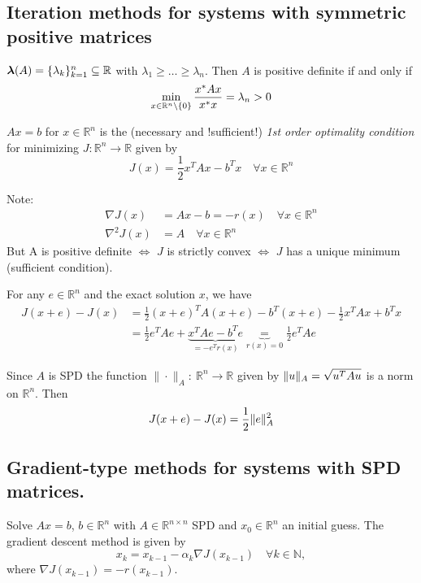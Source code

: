 \documentclass[12pt]{article}
\theoremstyle{definition}
\theoremstyle{remark}
\numberwithin{equation}{section}
\newcommand{\R}{\mathbb{R}}
\newcommand{\N}{\mathbb{N}}
\newcommand{\normempty}{\|\cdot\|}
\newcommand{\spectrum}[1]{\bm{\lambda}(#1)}
\DeclarePairedDelimiter{\norm}{\lVert}{\rVert}
\DeclarePairedDelimiter{\set}{\{}{\}}
\begin{document}
\subsection{Iteration methods for systems with symmetric positive matrices}
$\spectrum{A} = \set{\lambda_k}_{k=1}^n \subseteq \R$ with $\lambda_1 \geq \ldots \geq \lambda_n$. Then $A$ is positive definite if and only if
\begin{equation*}
  \min_{x \in \R^n \setminus \set{0}} \frac{x^*Ax}{x^*x} = \lambda_n > 0
\end{equation*}

$Ax = b$ for $x \in \R^n$ is the (necessary and !sufficient!) \emph{1st order optimality condition} for minimizing $J: \R^n \rightarrow \R$ given by
\begin{equation*}
  J(x) = \frac{1}{2}x^TAx - b^Tx \quad \forall x \in \R^n
\end{equation*}

Note:
\begin{align*}
  \nabla J(x) &= Ax - b = -r(x) \quad \forall x \in \R^n \\
  \nabla^2 J(x) &= A \quad \forall x \in \R^n
\end{align*}
But A is positive definite $\Leftrightarrow$ $J$ is strictly convex $\Leftrightarrow$ $J$ has a unique minimum (sufficient condition).

For any $e \in \R^n$ and the exact solution $x$, we have
\begin{align*}
  J(x+e) - J(x) &= \frac{1}{2}(x+e)^TA(x+e) - b^T(x+e) - \frac{1}{2}x^TAx + b^Tx \\
  &= \frac{1}{2}e^TAe + \underbrace{x^TAe - b^Te}_{=-e^T r(x)} \underbrace{=}_{{r(x) = 0}} \frac{1}{2}e^TAe
\end{align*}

Since $A$ is SPD the function $\normempty_A:\ \R^n \rightarrow \R$ given by $\norm{u}_A = \sqrt{u^TAu}$ is a norm on $\R^n$. Then
\begin{equation*}
  J(x+e) - J(x) = \frac{1}{2} \norm{e}_A^2
\end{equation*}

\subsection{Gradient-type methods for systems with SPD matrices.}

Solve $Ax = b$, $b \in \R^n$ with $A \in \R^{n\times n}$ SPD and $x_0 \in \R^n$ an initial guess. The gradient descent method is given by
\begin{equation*}
  x_k = x_{k-1} - \alpha_k \nabla J(x_{k-1}) \quad \forall k \in \N,
\end{equation*}
where $\nabla J(x_{k-1}) = -r(x_{k-1})$.
\end{document}
